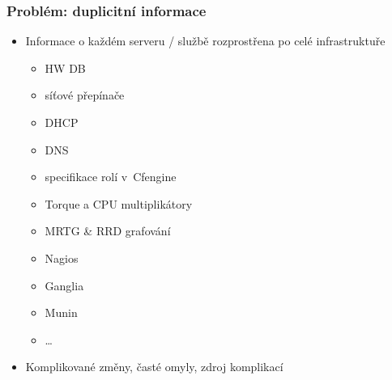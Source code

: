 \documentclass{beamer}
\begin{document}
\begin{frame}[fragile]
\frametitle{Problém: duplicitní informace}
\begin{itemize}
    \item Informace o každém serveru / službě rozprostřena po celé infrastruktuře
        \begin{itemize}
            \item HW DB
            \item síťové přepínače
            \item DHCP
            \item DNS
            \item specifikace rolí v~Cfengine
            \item Torque a CPU multiplikátory
            \item MRTG \& RRD grafování
            \item Nagios
            \item Ganglia
            \item Munin
            \item \ldots
        \end{itemize}
    \item Komplikované změny, časté omyly, zdroj komplikací
\end{itemize}
\end{frame}
\end{document}
